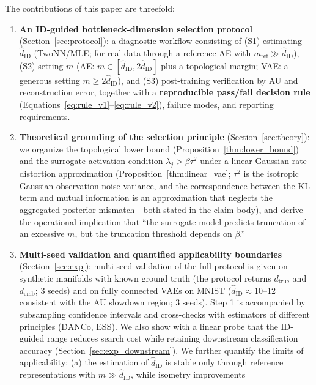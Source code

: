 \documentclass[make,article,submit,pdftex,moreauthors]{Definitions/mdpi}
\newcommand{\hatdID}{\hat{d}_{\mathrm{ID}}}
\newcommand{\dtrue}{d_{\mathrm{true}}}
\newcommand{\demb}{d_{\mathrm{emb}}}
\begin{document}
The contributions of this paper are threefold:
\begin{enumerate}
  \item \textbf{An ID-guided bottleneck-dimension selection protocol}
        (Section~\ref{sec:protocol}):
        a diagnostic workflow consisting of
        (S1) estimating $\hatdID$ (TwoNN/MLE; for real data through a
        reference AE with $m_{\mathrm{ref}} \gg \hatdID$),
        (S2) setting $m$ (AE: $m \in [\hatdID, 2\hatdID]$ plus a topological
        margin; VAE: a generous setting $m \geq 2\hatdID$), and
        (S3) post-training verification by AU and reconstruction error,
        together with a \textbf{reproducible pass/fail decision rule}
        (Equations~\eqref{eq:rule_v1}--\eqref{eq:rule_v2}), failure modes,
        and reporting requirements.
  \item \textbf{Theoretical grounding of the selection principle}
        (Section~\ref{sec:theory}):
        we organize the topological lower bound
        (Proposition~\ref{thm:lower_bound}) and the surrogate activation
        condition $\lambda_j > \beta\tau^2$ under a linear-Gaussian
        rate--distortion approximation (Proposition~\ref{thm:linear_vae};
        $\tau^2$ is the isotropic Gaussian observation-noise variance, and
        the correspondence between the KL term and mutual information is an
        approximation that neglects the aggregated-posterior mismatch---both
        stated in the claim body), and derive the operational implication
        that ``the surrogate model predicts truncation of an excessive $m$,
        but the truncation threshold depends on $\beta$.''
  \item \textbf{Multi-seed validation and quantified applicability
        boundaries} (Section~\ref{sec:exp}):
        multi-seed validation of the full protocol is given on synthetic
        manifolds with known ground truth (the protocol returns $\dtrue$ and
        $\demb$; 3 seeds) and on fully connected VAEs on MNIST
        ($\hatdID \approx 10$--12 consistent with the AU slowdown region;
        3 seeds).
        Step 1 is accompanied by subsampling confidence intervals and
        cross-checks with estimators of different principles (DANCo, ESS).
        We also show with a linear probe that the ID-guided range reduces
        search cost while retaining downstream classification accuracy
        (Section~\ref{sec:exp_downstream}).
        We further quantify the limits of applicability:
        (a) the estimation of $\hatdID$ is stable only through reference
        representations with $m \gg \hatdID$, while isometry improvements

\end{enumerate}
\end{document}
